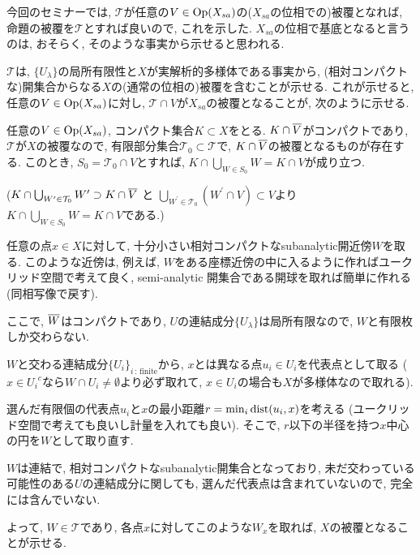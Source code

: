 \documentclass[../main]{subfiles}
\begin{document}
今回のセミナーでは,
$\mathcal{T}$が任意の$V\in\mathrm{Op}(X_{sa})$の($X_{sa}$の位相での)被覆となれば,
命題の被覆を$\mathcal{T}$とすれば良いので, これを示した.
$X_{sa}$の位相で基底となると言うのは, おそらく, そのような事実から示せると思われる.
\begin{rem*}
  $\mathcal{T}$は,
  $\{U_\lambda\}$の局所有限性と$X$が実解析的多様体である事実から,
  (相対コンパクトな)開集合からなる$X$の(通常の位相の)被覆を含むことが示せる.
  これが示せると,
  任意の$V\in\mathrm{Op}(X_{sa})$に対し,
  $\mathcal{T}\cap V$が$X_{sa}$の被覆となることが,
  次のように示せる.

  任意の$V\in\mathrm{Op}(X_{sa})$, コンパクト集合$K\subset X$をとる.
  $K\cap {\overline{V}}$がコンパクトであり,
  $\mathcal{T}$が$X$の被覆なので,
  有限部分集合$\mathcal{T}_0\subset\mathcal{T}$で,
  $K\cap {\overline{V}}$の被覆となるものが存在する.
  このとき, $S_0 = \mathcal{T}_0\cap V$とすれば,
  $K\cap\bigcup_{W\in S_0}W = K\cap V$が成り立つ.

  ($K\cap\bigcup_{W^\prime \in \mathcal{T}_0}W^\prime \supset K\cap {\overline{V}}$ と
  $\bigcup_{W^\prime \in \mathcal{T}_0}(W^\prime\cap V) \subset V$より
  $K\cap\bigcup_{W\in S_0}W = K\cap V$である.)
\end{rem*}
\begin{rem*}
  任意の点$x\in X$に対して,
  十分小さい相対コンパクトなsubanalytic開近傍$W$を取る.
  このような近傍は, 例えば,
  $W$をある座標近傍の中に入るように作ればユークリッド空間で考えて良く,
  semi-analytic 開集合である開球を取れば簡単に作れる(同相写像で戻す).

  ここで, ${\overline{W}}$はコンパクトであり,
  $U$の連結成分$\{U_\lambda\}$は局所有限なので,
  $W$と有限枚しか交わらない.

  $W$と交わる連結成分$\{U_i\}_{i\,:\,\mathrm{finite}}$から,
  $x$とは異なる点$u_i\in U_i$を代表点として取る
  ($x\in {U_i}^c$なら$W\cap U_i\neq\emptyset$より必ず取れて,
  $x\in U_i$の場合も$X$が多様体なので取れる).

  選んだ有限個の代表点$u_i$と$x$の最小距離$r = \min_i \mathrm{dist}(u_i,x)$を考える
  (ユークリッド空間で考えても良いし計量を入れても良い).
  そこで, $r$以下の半径を持つ$x$中心の円を$W$として取り直す.

  $W$は連結で, 相対コンパクトなsubanalytic開集合となっており,
  未だ交わっている可能性のある$U$の連結成分に関しても,
  選んだ代表点は含まれていないので,
  完全には含んでいない.

  よって, $W\in\mathcal{T}$であり,
  各点$x$に対してこのような$W_x$を取れば,
  $X$の被覆となることが示せる.
\end{rem*}
\end{document}

